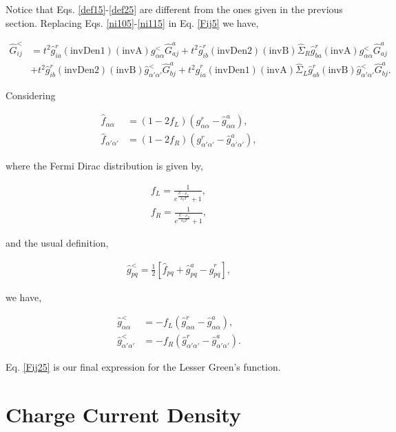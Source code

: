 \documentclass[10pt,prb,showpacs,amssymb,floatfix]{revtex4-1}
\newcommand{\tx}{\text}
\newcommand{\nn}{\nonumber}
\newcommand{\alp}{\alpha}
\newcommand{\Sg}{\Sigma}
\newcommand{\h}{\hat}
\begin{document}
Notice that Eqs. \eqref{def15}-\eqref{def25} are different from the ones given in the previous section. Replacing Eqs. \eqref{ni105}-\eqref{ni115} in Eq. \eqref{Fij5} we have,

  \begin{align}
  \label{Fij25}
 \h G^<_{ij} &=   t^2 \h g^r_{ia} (\tx{invDen1})(\tx{invA}) g^<_{\alp\alp} \h{G}^a_{aj} +t^2 \h g^r_{ib}(\tx{invDen2})(\tx{invB})\h \Sg_R  \h g^r_{b a}(\tx{invA})  g^<_{\alp\alp} \h{G}^a_{aj} \nn\\& 
  + t^2 \h g^r_{ib}(\tx{invDen2})(\tx{invB}) \h g^<_{\alp'\alp'}\h{G}^a_{b j}+t^2 \h g^r_{ia} (\tx{invDen1})(\tx{invA}) \h \Sg_L \h g^r_{ab} (\tx{invB}) \h g^<_{\alp'\alp'}\h{G}^a_{b j}. 
   \end{align}

Considering

\begin{align}
\h f_{\alp\alp} &= (1-2f_L)(g^r_{\alp\alp}-\h{g}^a_{\alp\alp}),\\
\h f_{\alp'\alp'} &= (1-2f_R)(g^r_{\alp'\alp'}-\h{g}^a_{\alp'\alp'}),
\end{align}

where the Fermi Dirac distribution is given by,

\begin{align}
f_L = \frac{1}{e^{\frac{E-\mu_L}{k_B T} } + 1}, \\
f_R = \frac{1}{e^{\frac{E-\mu_R}{k_B T} } + 1},
\end{align}

and the usual definition,

\begin{align}
\h g^<_{pq} = \frac{1}{2 }[\h f_{pq} + \h g^a_{pq} - \h g^r_{pq}],
\end{align}

we have,

\begin{align}
\h g^<_{\alp\alp} &= - f_L(\h g^r_{\alp\alp}-\h{g}^a_{\alp\alp}),\\
\h g^<_{\alp'\alp'} &= - f_R(\h g^r_{\alp'\alp'}-\h{g}^a_{\alp'\alp'}).
\end{align}


   
Eq. \eqref{Fij25} is our final expression for the Lesser Green's function.

\section{Charge Current Density}
\end{document}
